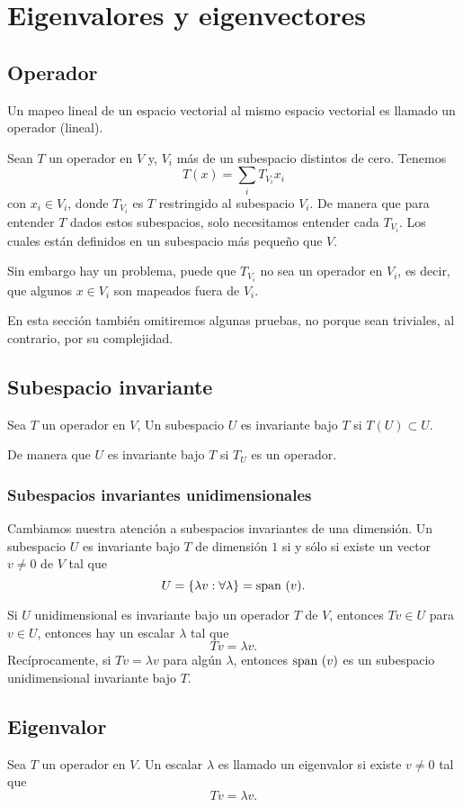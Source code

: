 \documentclass{article}
\begin{document}
\section{Eigenvalores y eigenvectores}
\subsection{Operador}
Un mapeo lineal de un espacio vectorial al mismo espacio 
vectorial es llamado un operador (lineal).

Sean $T$ un operador en $V$ y, $V_i$ más de un subespacio
distintos de cero. Tenemos
$$T(x) = \sum_i T_{V_i}x_i$$
con $x_i\in V_i$, donde $T_{V_i}$ es $T$ restringido al
subespacio $V_i$. De manera que para entender $T$ dados
estos subespacios, solo necesitamos entender cada $T_{V_i}$.
Los cuales están definidos en un subespacio más pequeño que
$V$.

Sin embargo hay un problema, puede que $T_{V_i}$ no sea un
operador en $V_i$, es decir, que algunos $x\in V_i$
son mapeados fuera de $V_i$.

En esta sección también omitiremos algunas pruebas, no porque
sean triviales, al contrario, por su complejidad.

\subsection{Subespacio invariante}
Sea $T$ un operador en $V$, Un subespacio $U$ es invariante
bajo $T$ si $T(U)\subset U$.

De manera que $U$ es invariante bajo $T$ si $T_U$ es un
operador.

\subsubsection*{Subespacios invariantes unidimensionales}
Cambiamos nuestra atención a subespacios invariantes de una
dimensión. Un subespacio $U$ es invariante bajo $T$
de dimensión $1$
si y sólo si existe un vector $v\neq 0$ de $V$ tal que
$$U = \{\lambda v: \forall \lambda\} = \text{span }(v).$$

Si $U$ unidimensional es invariante bajo un operador $T$ de 
$V$, entonces $Tv\in U$ para $v\in U$, entonces hay un 
escalar $\lambda$ tal que 
$$Tv=\lambda v.$$
Recíprocamente, si $Tv=\lambda v$ para algún $\lambda$,
entonces $\text{span }(v)$ es un subespacio
unidimensional invariante bajo $T$.
\newpage

\subsection{Eigenvalor}
Sea $T$ un operador en $V$. Un escalar $\lambda$ es llamado
un eigenvalor si existe $v\neq 0$ tal que
$$Tv=\lambda v.$$
\end{document}
